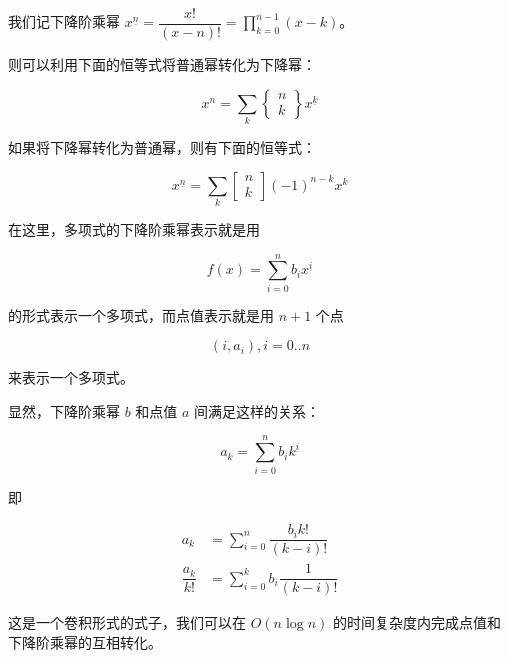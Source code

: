 
我们记下降阶乘幂 $x^{\underline{n}}=\dfrac{x!}{(x-n)!}=\prod_{k=0}^{n-1} (x-k)$。

则可以利用下面的恒等式将普通幂转化为下降幂：

$$
x^n=\sum_{k} \begin{Bmatrix}n\\ k\end{Bmatrix} x^{\underline{k}}
$$

如果将下降幂转化为普通幂，则有下面的恒等式：

$$
x^{\underline{n}}=\sum_{k} \begin{bmatrix}n\\ k\end{bmatrix} (-1)^{n-k} x^k
$$


在这里，多项式的下降阶乘幂表示就是用

$$
f(x)=\sum\limits_{i=0}^nb_i{x^{\underline{i}}}
$$

的形式表示一个多项式，而点值表示就是用 $n+1$ 个点

$$
(i,a_i),i=0..n
$$

来表示一个多项式。

显然，下降阶乘幂 $b$ 和点值 $a$ 间满足这样的关系：

$$
a_k=\sum\limits_{i=0}^{n}b_ik^{\underline{i}}
$$

即

$$
\begin{aligned}
a_k&=\sum\limits_{i=0}^{n}\dfrac{b_ik!}{(k-i)!}\\\dfrac{a_k}{k!}&=\sum\limits_{i=0}^kb_i\dfrac{1}{(k-i)!}
\end{aligned}
$$

这是一个卷积形式的式子，我们可以在 $O(n\log n)$ 的时间复杂度内完成点值和下降阶乘幂的互相转化。